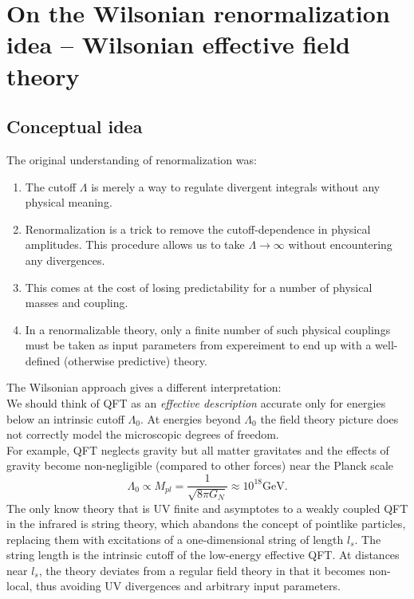 


















\section{On the Wilsonian renormalization idea -- Wilsonian effective field theory}
\subsection{Conceptual idea}
The original understanding of renormalization was:
\begin{enumerate}
	\item The cutoff $\Lambda$ is merely a way to regulate divergent integrals without any physical meaning.
	\item Renormalization is a trick to remove the cutoff-dependence in physical amplitudes. This procedure allows us to take $\Lambda \rightarrow \infty$ without encountering any divergences.
	\item This comes at the cost of losing predictability for a number of physical masses and coupling.
	\item In a renormalizable theory, only a finite number of such physical couplings must be taken as input parameters from expereiment to end up with a well-defined (otherwise predictive) theory.
\end{enumerate}
The Wilsonian approach gives a different interpretation:\\
We should think of QFT as an \emph{effective description} accurate only for energies below an intrinsic cutoff $\Lambda_0$. At energies beyond $\Lambda_0$ the field theory picture does not correctly model the microscopic degrees of freedom.\\
For example, QFT neglects gravity but all matter gravitates and the effects of gravity become non-negligible (compared to other forces) near the Planck scale
\begin{equation}
	\Lambda_0 \propto M_{pl} = \frac{1}{\sqrt{8  \pi G_N}} \approx 10^{18} \mathrm{GeV}.
\end{equation}
The only know theory that is UV finite and asymptotes to a weakly coupled QFT in the infrared is string theory, which abandons the concept of pointlike particles, replacing them with excitations of a one-dimensional string of length $l_s$. The string length is the intrinsic cutoff of the low-energy effective QFT. At distances near $l_s$, the theory deviates from a regular field theory in that it becomes non-local, thus avoiding UV divergences and arbitrary input parameters.\\
